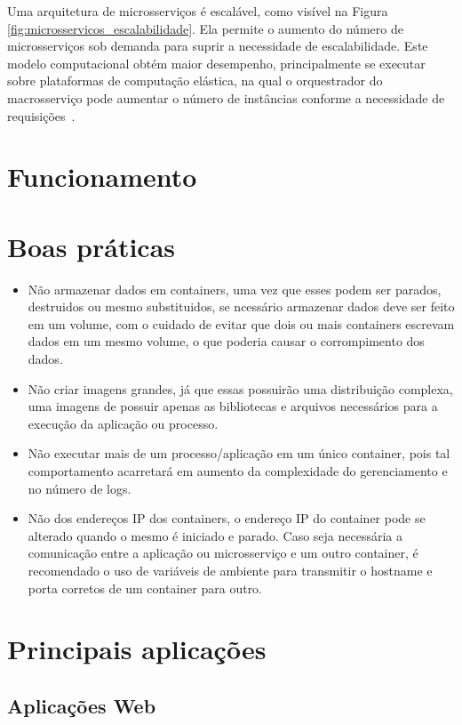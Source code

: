 Uma arquitetura de microsserviços é escalável, como visível na Figura \ref{fig:microsservicos_escalabilidade}.
%
Ela permite o aumento do número de microsserviços sob demanda para suprir a necessidade de escalabilidade.
%
Este modelo computacional obtém maior desempenho, principalmente se executar sobre plataformas de computação elástica, na qual o orquestrador do macrosserviço pode aumentar o número de instâncias conforme a necessidade de requisições~\cite{Nadareishvili2016Aug}.


\section{Funcionamento}

\section{Boas práticas}
\begin{itemize}
	\item Não armazenar dados em containers, uma vez que esses podem ser parados, destruidos ou mesmo substituidos, se ncessário armazenar dados deve ser feito em um volume, com o cuidado de evitar que dois ou mais containers escrevam dados em um mesmo volume, o que poderia causar o corrompimento dos dados.
	\item Não criar imagens grandes, já que essas possuirão uma distribuição complexa, uma imagens de possuir apenas as bibliotecas e arquivos necessários para a execução da aplicação ou processo.
	\item Não executar mais de um processo/aplicação em um único container, pois tal comportamento acarretará em aumento da complexidade do gerenciamento e no número de logs.
	\item Não dos endereços IP dos containers, o endereço IP do container pode se alterado quando o mesmo é iniciado e parado. Caso seja necessária a comunicação entre a aplicação ou microsserviço e um outro container, é recomendado o uso de variáveis de ambiente para transmitir o hostname e porta corretos de um container para outro.
\end{itemize}



\section{Principais aplicações}

\subsection{Aplicações Web}

